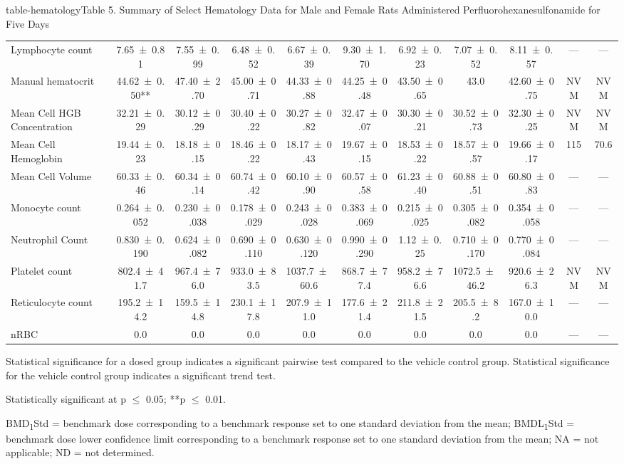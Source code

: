 \begin{landscape}
\begin{niehstable}{table-hematology}{Table 5. Summary of Select Hematology Data for Male and Female Rats Administered Perfluorohexanesulfonamide for Five Days}
\begin{tabular}{lcccccccccc}
Lymphocyte count & 7.65 ± 0.81 & 7.55 ± 0.99 & 6.48 ± 0.52 & 6.67 ± 0.39 & 9.30 ± 1.70 & 6.92 ± 0.23 & 7.07 ± 0.52 & 8.11 ± 0.57 & — & — \\
Manual hematocrit & 44.62 ± 0.50** & 47.40 ± 2.70 & 45.00 ± 0.71 & 44.33 ± 0.88 & 44.25 ± 0.48 & 43.50 ± 0.65 & 43.0 & 42.60 ± 0.75 & NVM & NVM \\
Mean Cell HGB Concentration & 32.21 ± 0.29 & 30.12 ± 0.29 & 30.40 ± 0.22 & 30.27 ± 0.82 & 32.47 ± 0.07 & 30.30 ± 0.21 & 30.52 ± 0.73 & 32.30 ± 0.25 & NVM & NVM \\
Mean Cell Hemoglobin & 19.44 ± 0.23 & 18.18 ± 0.15 & 18.46 ± 0.22 & 18.17 ± 0.43 & 19.67 ± 0.15 & 18.53 ± 0.22 & 18.57 ± 0.57 & 19.66 ± 0.17 & 115 & 70.6 \\
Mean Cell Volume & 60.33 ± 0.46 & 60.34 ± 0.14 & 60.74 ± 0.42 & 60.10 ± 0.90 & 60.57 ± 0.58 & 61.23 ± 0.40 & 60.88 ± 0.51 & 60.80 ± 0.83 & — & — \\
Monocyte count & 0.264 ± 0.052 & 0.230 ± 0.038 & 0.178 ± 0.029 & 0.243 ± 0.028 & 0.383 ± 0.069 & 0.215 ± 0.025 & 0.305 ± 0.082 & 0.354 ± 0.058 & — & — \\
Neutrophil Count & 0.830 ± 0.190 & 0.624 ± 0.082 & 0.690 ± 0.110 & 0.630 ± 0.120 & 0.990 ± 0.290 & 1.12 ± 0.25 & 0.710 ± 0.170 & 0.770 ± 0.084 & — & — \\
Platelet count & 802.4 ± 41.7 & 967.4 ± 76.0 & 933.0 ± 83.5 & 1037.7 ± 60.6 & 868.7 ± 77.4 & 958.2 ± 76.6 & 1072.5 ± 46.2 & 920.6 ± 26.3 & NVM & NVM \\
Reticulocyte count & 195.2 ± 14.2 & 159.5 ± 14.8 & 230.1 ± 17.8 & 207.9 ± 11.0 & 177.6 ± 21.4 & 211.8 ± 21.5 & 205.5 ± 8.2 & 167.0 ± 10.0 & — & — \\
nRBC & 0.0 & 0.0 & 0.0 & 0.0 & 0.0 & 0.0 & 0.0 & 0.0 & — & — \\
\bottomrule
\end{tabular}
\begin{tablenotes}
\item Statistical significance for a dosed group indicates a significant pairwise test compared to the vehicle control group. Statistical significance for the vehicle control group indicates a significant trend test.
\item *Statistically significant at p \ensuremath{\le} 0.05; **p \ensuremath{\le} 0.01.
\item BMD\textsubscript{1}Std = benchmark dose corresponding to a benchmark response set to one standard deviation from the mean; BMDL\textsubscript{1}Std = benchmark dose lower confidence limit corresponding to a benchmark response set to one standard deviation from the mean; NA = not applicable; ND = not determined.

\end{tablenotes}
\end{niehstable}
\end{landscape}
